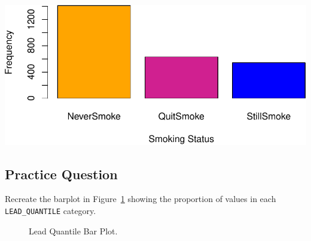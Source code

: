 \documentclass[
  letterpaper,
]{krantz}
\begin{document}
\begin{center}
\includegraphics[width=1\textwidth,height=\textheight]{book/exploratory_analysis_files/figure-pdf/unnamed-chunk-11-1.pdf}
\end{center}

\subsection{Practice Question}\label{practice-question-6}

Recreate the barplot in Figure~\ref{fig-lead-quantile-bar-plot} showing
the proportion of values in each \texttt{LEAD\_QUANTILE} category.

\begin{figure}


\caption{\label{fig-lead-quantile-bar-plot}Lead Quantile Bar Plot.}

\end{figure}%
\end{document}

